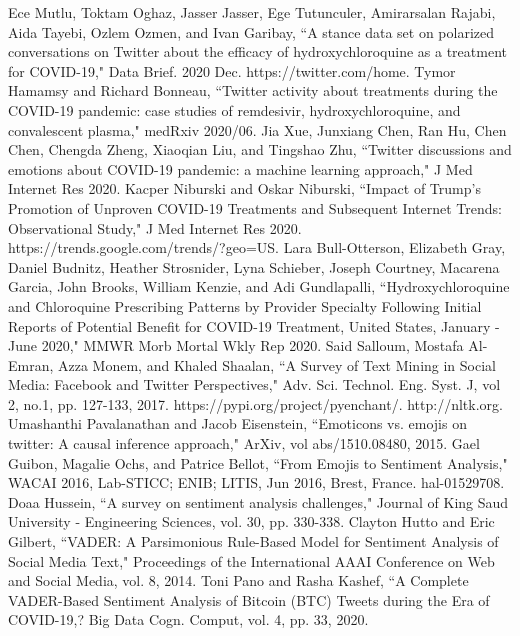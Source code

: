 \documentclass[conference]{IEEEtran}
\begin{document}
	\begin{thebibliography}{00}
		 Ece Mutlu, Toktam Oghaz, Jasser Jasser, Ege Tutunculer, Amirarsalan Rajabi, Aida Tayebi, Ozlem Ozmen, and Ivan Garibay, ``A stance data set on polarized conversations on Twitter about the efficacy of hydroxychloroquine as a treatment for COVID-19," Data Brief. 2020 Dec.
		 https://twitter.com/home.
		 Tymor Hamamsy and Richard Bonneau, ``Twitter activity about treatments during the COVID-19 pandemic: case studies of remdesivir, hydroxychloroquine, and convalescent plasma," medRxiv 2020/06.
		 Jia Xue, Junxiang Chen, Ran Hu, Chen Chen, Chengda Zheng, Xiaoqian Liu, and Tingshao Zhu, ``Twitter discussions and emotions about COVID-19 pandemic: a machine learning approach," J Med Internet Res 2020.
		 Kacper Niburski and Oskar Niburski, ``Impact of Trump's Promotion of Unproven COVID-19 Treatments and Subsequent Internet Trends: Observational Study," J Med Internet Res 2020.
		 https://trends.google.com/trends/?geo=US.
		 Lara Bull-Otterson, Elizabeth Gray, Daniel Budnitz, Heather Strosnider, Lyna Schieber, Joseph Courtney, Macarena Garcia, John Brooks, William Kenzie, and Adi Gundlapalli, ``Hydroxychloroquine and Chloroquine Prescribing Patterns by Provider Specialty Following Initial Reports of Potential Benefit for COVID-19 Treatment, United States, January - June 2020," MMWR Morb Mortal Wkly Rep 2020.
		 Said Salloum, Mostafa Al-Emran, Azza Monem, and Khaled Shaalan, ``A Survey of Text Mining in Social Media: Facebook and Twitter Perspectives," Adv. Sci. Technol. Eng. Syst. J, vol 2, no.1, pp. 127-133, 2017.
		 https://pypi.org/project/pyenchant/.
		 http://nltk.org.
		 Umashanthi Pavalanathan and Jacob Eisenstein, ``Emoticons vs. emojis on twitter: A causal inference approach," ArXiv, vol abs/1510.08480, 2015.
		 Gael Guibon, Magalie Ochs, and Patrice Bellot, ``From Emojis to Sentiment Analysis," WACAI 2016, Lab-STICC; ENIB; LITIS, Jun 2016, Brest, France. hal-01529708.
		 Doaa Hussein, ``A survey on sentiment analysis challenges," Journal of King Saud University - Engineering Sciences, vol. 30, pp. 330-338.
		 Clayton Hutto and Eric Gilbert, ``VADER: A Parsimonious Rule-Based Model for Sentiment Analysis of Social Media Text," Proceedings of the International AAAI Conference on Web and Social Media, vol. 8, 2014.
		 Toni Pano and Rasha Kashef, ``A Complete VADER-Based Sentiment Analysis of Bitcoin (BTC) Tweets during the Era of COVID-19,? Big Data Cogn. Comput, vol. 4, pp. 33, 2020.

\end{thebibliography}
\end{document}
